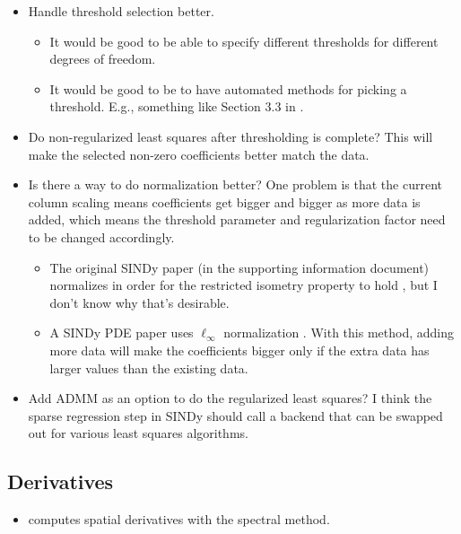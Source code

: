 \documentclass{article}
\begin{document}
\begin{itemize}
    \item Handle threshold selection better.
    \begin{itemize}
        \item It would be good to be able to specify different thresholds for
          different degrees of freedom.
        \item It would be good to be to have automated methods for picking a
          threshold. E.g., something like Section 3.3 in \cite{shea2020sindy-bvp}.
    \end{itemize}

    \item Do non-regularized least squares after thresholding is complete? This
      will make the selected non-zero coefficients better match the data.

    \item Is there a way to do normalization better? One problem is that the
      current column scaling means coefficients get bigger and bigger as more
      data is added, which means the threshold parameter and regularization
      factor need to be changed accordingly. 
    \begin{itemize}
        \item The original SINDy paper (in the supporting information document)
          normalizes in order for the restricted isometry property to hold
          \cite{brunton2016sindy}, but I don't know why that's desirable.
        \item A SINDy PDE paper uses $\ell_\infty$ normalization
          \cite{schaeffer2017sindy-pde2}. With this method, adding more data
          will make the coefficients bigger only if the extra data has larger
          values than the existing data.
    \end{itemize}

    \item Add ADMM as an option to do the regularized least squares? I think the
      sparse regression step in SINDy should call a backend that can be swapped
      out for various least squares algorithms.
\end{itemize}

\subsection{Derivatives}

\begin{itemize}
    \item \cite{schaeffer2017sindy-pde2} computes spatial derivatives with the spectral method.
\end{itemize}
\end{document}
